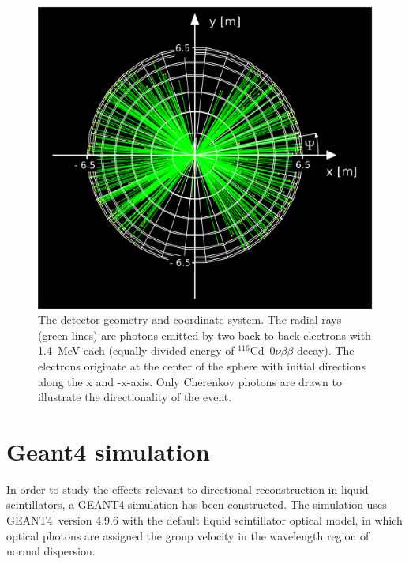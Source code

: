 \documentclass[cits]{JINST}
\newcommand{\GEANT}{GEANT4}
\begin{document}
\begin{figure}
        \begin{center}
        \includegraphics[scale=0.4]{graphs/geometry_plot_labels.pdf}
        \caption[]{The detector geometry and coordinate system.
        The radial rays (green lines) are photons emitted by two back-to-back electrons with 1.4~MeV each
        (equally divided energy of $^{116}$Cd~$0\nu\beta\beta$ decay). The electrons originate at
        the center of the sphere with initial directions along the x
        and -x-axis. Only Cherenkov photons are drawn to illustrate the
        directionality of the event. \label{detector_view}}
        \end{center}
\end{figure}



\section{Geant4 simulation}
\label{sim_section}
In order to study the effects relevant to directional reconstruction
in liquid scintillators, a \GEANT \newline 
\cite{geant4one,geant4two} simulation
has been constructed. The simulation uses \GEANT~version 4.9.6 with the default liquid scintillator
optical model, in which optical photons are
assigned the group velocity in the wavelength region of normal
dispersion.
\end{document}
